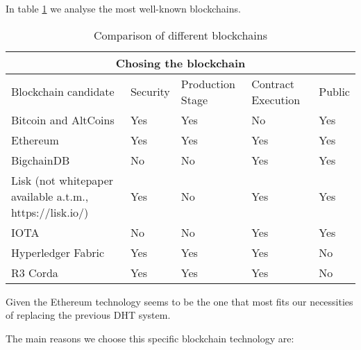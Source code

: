 In table \ref{Table:1} we analyse the most well-known blockchains.

\begin{table}[h!]
\centering
\caption{Comparison of different blockchains}
\label{Table:1}
\begin{tabular}{ |p{7cm}|p{2cm}|p{2cm}|p{2cm}|p{2cm}|  }
\hline
\multicolumn{5}{|c|}{Chosing the blockchain} \\
\hline
Blockchain candidate & Security & Production Stage & Contract Execution & Public \\
\hline
Bitcoin and AltCoins \cite{Nakamoto_bitcoin:a} & Yes & Yes & No\cite{Bitcoin_notTuringComplete} & Yes \\
\hline
Ethereum \cite{ethereum_whitepaper} & Yes & Yes & Yes & Yes \\
\hline
BigchainDB \cite{bigchaindb_whitepaper} & No \cite{_bigchaindb_bullshit} \ & No & Yes & Yes \\
\hline
Lisk (not whitepaper available a.t.m., https://lisk.io/)& Yes & No \cite{lisk_problems} & Yes & Yes \\
\hline
IOTA \cite{iota_whitepaper}& No \cite{iota_problems} & No & Yes & Yes \\
\hline
Hyperledger Fabric \cite{martindale_fabric:_2017}& Yes & Yes & Yes & No \\
\hline
R3 Corda \cite{corda_whitepaper}& Yes & Yes & Yes & No \\
\hline
\end{tabular}
\end{table}



Given the Ethereum technology seems to be the one that most fits our necessities of replacing the previous DHT system.




\FloatBarrier
The main reasons we choose this specific blockchain technology are:


